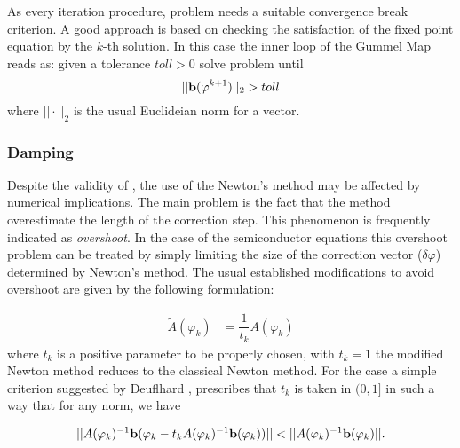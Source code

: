As every iteration procedure, problem  needs a suitable convergence break criterion. A good approach is based on checking the satisfaction of the fixed point equation  by the $k$-th solution. In this case the inner loop of the Gummel Map reads as: given a tolerance $toll>0$ solve problem  until
\begin{equation}
||\mathbf{b}(\varphi^{k+1})||_2 > toll
\end{equation}
where $||\cdot ||_2$ is the usual Euclideian norm for a vector.

\subsubsection{Damping}

Despite the validity of , the 
use of the Newton's method may be affected by numerical implications.
The main problem is the fact that the method overestimate the length of the correction step. This phenomenon is frequently indicated as \textit{overshoot}. In the case of the semiconductor equations this overshoot problem can be treated by simply limiting the size of the correction vector ($\delta \varphi$) determined by Newton's method. The usual established modifications to avoid overshoot are given by the following formulation:


\begin{align}
\tilde{A}(\varphi_k)&=\dfrac{1}{t_k}A(\varphi_k) \label{eq: NLP mod used}
\end{align}
where $t_k$ is a positive parameter to be properly chosen, with $t_k=1$ the modified Newton method reduces to the classical Newton method.
For the case  a simple criterion suggested by Deuflhard \cite{DefulhardDamp}, prescribes that $t_k$ is taken in $(0,1]$ in such a way that for any norm, we have

\begin{equation}
\label{eq: extended criterion}
||A(\varphi_k)^{-1}\vect{b}(\varphi_k-t_kA(\varphi_k)^{-1}\vect{b}(\varphi_k))||<||A(\varphi_k)^{-1}\vect{b}(\varphi_k)||.
\end{equation}

